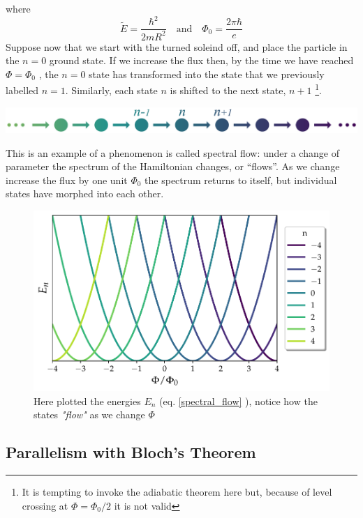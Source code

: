         where
        \[
        \tilde E=\frac{\hbar^2}{2mR^2} \quad \textrm{and} \quad \Phi_0=\frac{2\pi \hbar}e
        \]
        Suppose now that we start with the turned soleind off, and place the particle in the $n=0$ ground
        state. If we increase the flux then, by the time we have reached $\Phi=\Phi_0$ , the $n=0$ state
        has transformed into the state that we previously labelled $n = 1$. Similarly, each state
        $n$ is shifted to the next state, $n + 1$ \footnote{It is tempting to invoke the adiabatic theorem
        here but, because of level crossing at $\Phi=\Phi_0/2$ it is not valid}.\\
        \begin{minipage}{\textwidth}
                    \includegraphics[width=1\linewidth]{Immagini/topo/flow.pdf}
        \end{minipage}
        This is an example of a phenomenon is called spectral flow: under a change of parameter
        the spectrum of the Hamiltonian changes, or “flows”. As we change increase the flux
        by one unit  $\Phi_0$ the spectrum returns to itself, but individual states have morphed into
        each other. \cite{tong2016lectures}
        \begin{figure}[h]
            \includegraphics[width=\linewidth]{Immagini/topo/spectral_flow.pdf}
            \caption{Here plotted the energies $E_n$ (eq. \ref{spectral_flow} ), notice how the states \textit{"flow"} as we change $\Phi$}
            \label{fig:spectral-flow}
        \end{figure}
    \subsection*{Parallelism with Bloch's Theorem}
    
